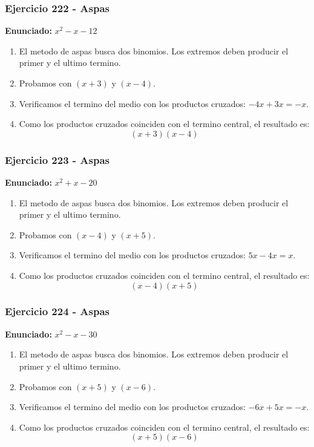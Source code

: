 \documentclass[11pt,a4paper]{article}
\begin{document}
\vspace{0.2cm}
\subsubsection*{Ejercicio 222 - Aspas}
\textbf{Enunciado:} $ x^{2} - x - 12 $\par
\begin{enumerate}[leftmargin=2em]
\item El metodo de aspas busca dos binomios. Los extremos deben producir el primer y el ultimo termino.
\item Probamos con \((x + 3)\) y \((x - 4)\).
\item Verificamos el termino del medio con los productos cruzados: \(- 4 x+3 x=- x\).
\item Como los productos cruzados coinciden con el termino central, el resultado es: \[\boxed{\left(x + 3\right)\left(x - 4\right)}\]
\end{enumerate}

\vspace{0.2cm}
\subsubsection*{Ejercicio 223 - Aspas}
\textbf{Enunciado:} $ x^{2} + x - 20 $\par
\begin{enumerate}[leftmargin=2em]
\item El metodo de aspas busca dos binomios. Los extremos deben producir el primer y el ultimo termino.
\item Probamos con \((x - 4)\) y \((x + 5)\).
\item Verificamos el termino del medio con los productos cruzados: \(5 x- 4 x=x\).
\item Como los productos cruzados coinciden con el termino central, el resultado es: \[\boxed{\left(x - 4\right)\left(x + 5\right)}\]
\end{enumerate}

\vspace{0.2cm}
\subsubsection*{Ejercicio 224 - Aspas}
\textbf{Enunciado:} $ x^{2} - x - 30 $\par
\begin{enumerate}[leftmargin=2em]
\item El metodo de aspas busca dos binomios. Los extremos deben producir el primer y el ultimo termino.
\item Probamos con \((x + 5)\) y \((x - 6)\).
\item Verificamos el termino del medio con los productos cruzados: \(- 6 x+5 x=- x\).
\item Como los productos cruzados coinciden con el termino central, el resultado es: \[\boxed{\left(x + 5\right)\left(x - 6\right)}\]
\end{enumerate}
\end{document}
